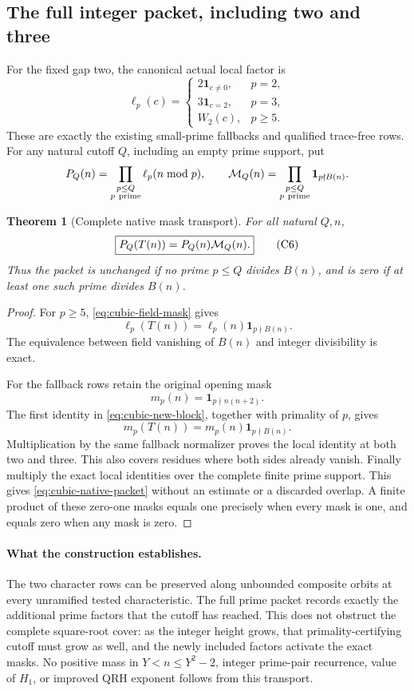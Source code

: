 \documentclass[11pt]{article}
\newtheorem{theorem}{Theorem}[section]
\begin{document}
\subsection{The full integer packet, including two and three}

For the fixed gap two, the canonical actual local factor is
\[
 \ell_p(c)=
 \begin{cases}
  2\mathbf1_{c\ne0},&p=2,\\
  3\mathbf1_{c=2},&p=3,\\
  W_2(c),&p\ge5.
 \end{cases}
\]
These are exactly the existing small-prime fallbacks and qualified
trace-free rows. For any natural cutoff \(Q\), including an empty prime
support, put
\[
 P_Q(n)=\prod_{\substack{p\le Q\\p\ {\rm prime}}}\ell_p(n\bmod p),
 \qquad
 {\cal M}_Q(n)=
 \prod_{\substack{p\le Q\\p\ {\rm prime}}}\mathbf1_{p\nmid B(n)}.
\]

\begin{theorem}[Complete native mask transport]
\label{thm:cubic-native-packet}
For all natural \(Q,n\),
\[
 \boxed{P_Q(T(n))=P_Q(n){\cal M}_Q(n).}
 \tag{C6}\label{eq:cubic-native-packet}
\]
Thus the packet is unchanged if no prime \(p\le Q\) divides \(B(n)\),
and is zero if at least one such prime divides \(B(n)\).
\end{theorem}
\begin{proof}
For \(p\ge5\), \eqref{eq:cubic-field-mask} gives
\[
 \ell_p(T(n))=\ell_p(n)\mathbf1_{p\nmid B(n)}.
\]
The equivalence between field vanishing of \(B(n)\) and integer
divisibility is exact.

For the fallback rows retain the original opening mask
\[
 m_p(n)=\mathbf1_{p\nmid n(n+2)}.
\]
The first identity in \eqref{eq:cubic-new-block}, together with primality
of \(p\), gives
\[
 m_p(T(n))=m_p(n)\mathbf1_{p\nmid B(n)}.
\]
Multiplication by the same fallback normalizer proves the local identity
at both two and three. This also covers residues where both sides
already vanish. Finally multiply the exact local identities over the
complete finite prime support. This gives \eqref{eq:cubic-native-packet}
without an estimate or a discarded overlap. A finite product of these
zero-one masks equals one precisely when every mask is one, and equals
zero when any mask is zero.
\end{proof}

\paragraph{What the construction establishes.}
The two character rows can be preserved along unbounded composite
orbits at every unramified tested characteristic.
The full prime packet records exactly the additional prime factors
that the cutoff has reached.
This does not obstruct the complete square-root cover:
as the integer height grows, that primality-certifying cutoff must grow
as well, and the newly included factors activate the exact masks.
No positive mass in \(Y<n\le Y^2-2\), integer prime-pair recurrence,
value of \(H_1\), or improved QRH exponent follows from this transport.
\end{document}
